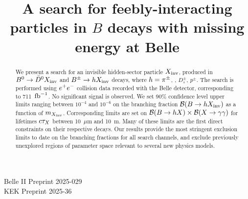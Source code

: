 \usepackage{xspace}
\usepackage{orcidlink}


\def\Dbar {\kern 0.2em\bar{\kern -0.2em D}{}\xspace}
\def\Dzb {\ensuremath{\Dbar^0}\xspace}









\begin{minipage}[h]{0.45\textwidth}
\begin{flushright}






Belle II Preprint 2025-029 \\
KEK Preprint 2025-36 \\
\end{flushright}
\end{minipage}
\vspace{20pt}
\texorpdfstring{}{}
\title{\texorpdfstring{A search for feebly-interacting particles in $B$ decays with missing energy at Belle}{A search for feebly interacting particles in missing energy B decays at Belle}}






\begin{abstract}
We present a search for an invisible hidden-sector particle $X_{\rm{inv}}$, produced in $\Bz \to \Dzb\Xinv$ and $B^\pm\rightarrow hX_{\rm{inv}}$ decays, where $h = \pi^\pm$, \Kpm, $D_{s}^\pm$, $p^\pm$. The search is performed using $e^+e^-$ collision data recorded with the Belle detector, corresponding to 711 $\mbox{\,fb}^{-1}$. No significant signal is observed. We set 90\% confidence level upper limits ranging between $10^{-4}$ and $10^{-6}$ on the branching fraction $\mathcal{B}(B \rightarrow hX_{\rm{inv}})$ as a function of $m_{X_{\rm{inv}}}$. Corresponding limits are set on $\mathcal{B}(B \rightarrow hX)\times\mathcal{B}(X\rightarrow\gamma\gamma)$ for lifetimes $c\tau_{X}$ between 10~$\mu$m and 10~m. Many of these limits are the first direct constraints on their respective decays. Our results provide the most stringent exclusion limits to date on the branching fractions for all search channels, and exclude previously unexplored regions of parameter space relevant to several new physics models.
\end{abstract}

